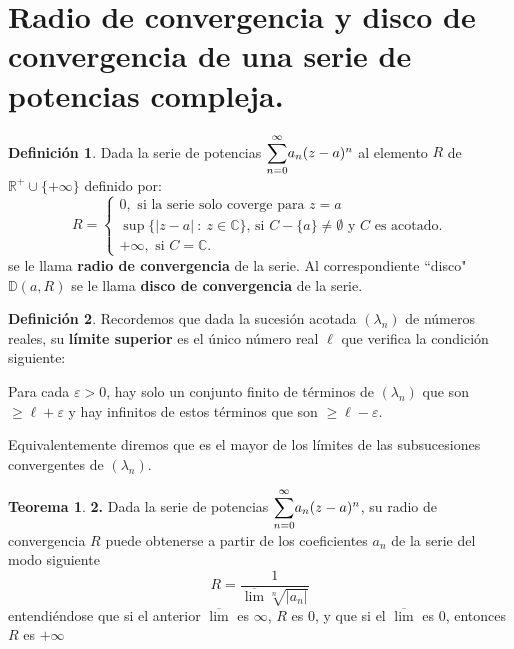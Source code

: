 \documentclass[12pt,twoside]{report}
\theoremstyle{azul}
\theoremstyle{azul2}
\theoremstyle{plain}
\theoremstyle{definition}
\newtheorem{defin}{Definición}[chapter]
\newtheorem*{theo}{Teorema}
\theoremstyle{remark}
\begin{document}
\section{Radio de convergencia y disco de convergencia de una serie de potencias compleja. }
\begin{defin}
Dada la serie de potencias $\mathlarger{\sum_{n=0}^{\infty}} a_n (z-a)^n$ al elemento $R$ de $\mathbb{R}^+ \cup \{+\infty \}$ definido por:
$$R = \left\{ \begin{array}{l}
    0, \text{ si la serie solo coverge para } z=a\\
    \sup\{|z-a| \: : \: z \in \mathbb{C}\} \text{, si } C-\{a\} \neq \emptyset \text{ y } C \text{ es acotado.} \\
    + \infty, \text{ si } C = \mathbb{C}.
\end{array}\right.$$
se le llama \textbf{radio de convergencia} de la serie. Al correspondiente ``disco" \: $\mathbb{D}(a,R)$ se le llama \textbf{disco de convergencia} de la serie.
\end{defin}
\begin{defin} 
Recordemos que dada la sucesión acotada $(\lambda_n)$ de números reales, su \textbf{límite superior} es el único número real $\ell$ que verifica la condición siguiente:

Para cada $\varepsilon > 0$, hay solo un conjunto finito de términos de $(\lambda_n)$ que son $\geq \ell + \varepsilon$ y hay infinitos de estos términos que son $\geq \ell - \varepsilon$. 

Equivalentemente diremos que es el mayor de los límites de las subsucesiones convergentes de $(\lambda_n)$. 
\end{defin}
\begin{theo} \textbf{2.} Dada la serie de potencias $\mathlarger{\sum_{n=0}^{\infty}} a_n (z-a)^n$, su radio de convergencia $R$ puede obtenerse a partir de los coeficientes $a_n$ de la serie del modo siguiente
$$R = \dfrac{1}{\overline{\lim} \sqrt[n]{|a_n|}}$$
entendiéndose que si el anterior $\overline{\lim} $ es $\infty$, $R$ es 0, y que si el $\overline{\lim} $ es 0, entonces $R$ es $+\infty$
\end{theo}
\end{document}
